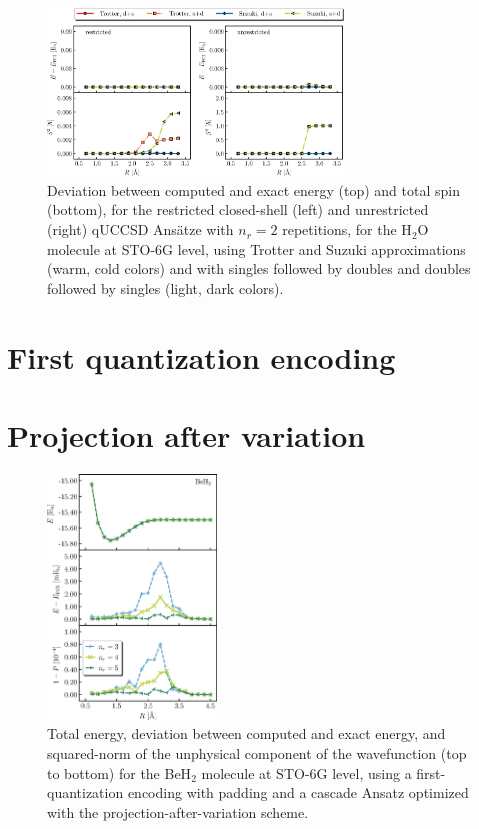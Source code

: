 \documentclass[aps,pra,onecolumn]{revtex4-2}
\begin{document}
\begin{figure}[t!]
\includegraphics[width=0.7\textwidth]{../figures/qUCCSD_flavors/quccsd_reps_2.eps}
\caption{Deviation between computed and exact energy (top) and total spin (bottom), for the restricted closed-shell (left) and unrestricted (right) qUCCSD Ans\"{a}tze with $n_r=2$ repetitions, for the H$_2$O molecule at STO-6G level, using Trotter and Suzuki approximations (warm, cold colors) and with singles followed by doubles and doubles followed by singles (light, dark colors).}
\label{figure:quccsd_reps_2}
\end{figure} 

\section{First quantization encoding}
\label{sec:first}

\section{Projection after variation}
\label{sec:pav}

\begin{figure}[t!]
\includegraphics[width=0.4\textwidth]{../figures/first_quantization_pad_pav/first_quantization_pad_pav.eps}
\caption{Total energy, deviation between computed and exact energy, and squared-norm of the unphysical component of the wavefunction
(top to bottom) for the BeH$_2$ molecule at STO-6G level, 
using a first-quantization encoding with padding and a cascade Ansatz optimized with the projection-after-variation scheme.}
\label{figure:pad_pav}
\end{figure} 
\end{document}
